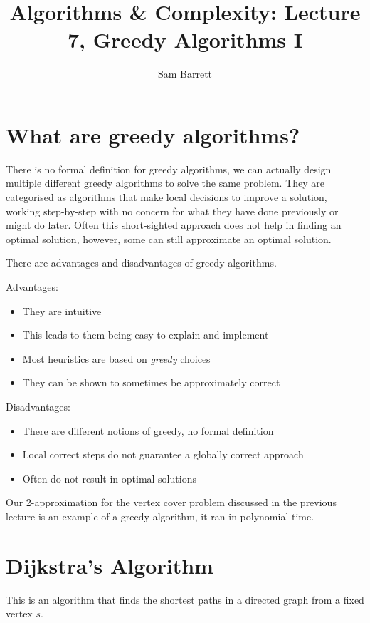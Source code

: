 \documentclass{article}
\title{Algorithms \& Complexity: Lecture 7, Greedy Algorithms I}
\author{Sam Barrett}
\begin{document}
\maketitle

\section{What are greedy algorithms?}

There is no formal definition for greedy algorithms, we can actually design multiple different greedy algorithms to solve the same problem. They are categorised as algorithms that make local decisions to improve a solution, working step-by-step with no concern for what they have done previously or might do later. Often this short-sighted approach does not help in finding an optimal solution, however, some can still approximate an optimal solution.

There are advantages and disadvantages of greedy algorithms.

Advantages:

\begin{itemize}
  \item They are intuitive
  \item This leads to them being easy to explain and implement
  \item Most heuristics are based on \textit{greedy} choices
  \item They can be shown to sometimes be approximately correct
\end{itemize}

Disadvantages:

\begin{itemize}
  \item There are different notions of greedy, no formal definition
  \item Local correct steps do not guarantee a globally correct approach
  \item Often do not result in optimal solutions
\end{itemize}

Our 2-approximation for the vertex cover problem discussed in the previous lecture is an example of a greedy algorithm, it ran in polynomial time.

\section{Dijkstra's Algorithm}

This is an algorithm that finds the shortest paths in a directed graph from a fixed vertex $s$.
\end{document}
